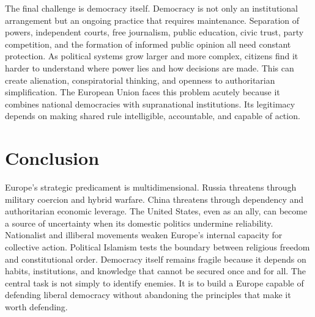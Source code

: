 The final challenge is democracy itself. Democracy is not only an institutional arrangement but an ongoing practice that requires maintenance. Separation of powers, independent courts, free journalism, public education, civic trust, party competition, and the formation of informed public opinion all need constant protection. As political systems grow larger and more complex, citizens find it harder to understand where power lies and how decisions are made. This can create alienation, conspiratorial thinking, and openness to authoritarian simplification. The European Union faces this problem acutely because it combines national democracies with supranational institutions. Its legitimacy depends on making shared rule intelligible, accountable, and capable of action.

\section{Conclusion}

Europe's strategic predicament is multidimensional. Russia threatens through military coercion and hybrid warfare. China threatens through dependency and authoritarian economic leverage. The United States, even as an ally, can become a source of uncertainty when its domestic politics undermine reliability. Nationalist and illiberal movements weaken Europe's internal capacity for collective action. Political Islamism tests the boundary between religious freedom and constitutional order. Democracy itself remains fragile because it depends on habits, institutions, and knowledge that cannot be secured once and for all. The central task is not simply to identify enemies. It is to build a Europe capable of defending liberal democracy without abandoning the principles that make it worth defending.

\endgroup
